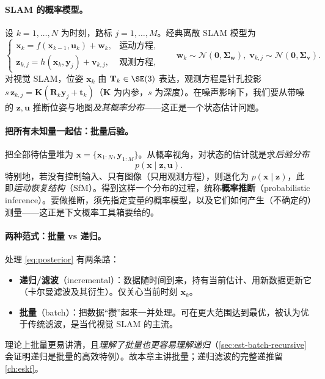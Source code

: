 \paragraph{SLAM 的概率模型。}
设 $k=1,\dots,N$ 为时刻，路标 $j=1,\dots,M$。经典离散 SLAM 模型为\cite{gaoxiang2019slam14}
\begin{equation}
  \begin{cases}
    \mathbf{x}_k=f(\mathbf{x}_{k-1},\mathbf{u}_k)+\mathbf{w}_k, & \text{运动方程},\\
    \mathbf{z}_{k,j}=h(\mathbf{x}_k,\mathbf{y}_j)+\mathbf{v}_{k,j}, & \text{观测方程},
  \end{cases}
  \qquad
  \mathbf{w}_k\sim\mathcal{N}(\mathbf{0},\boldsymbol{\Sigma}_{\mathbf{w}}),\;
  \mathbf{v}_{k,j}\sim\mathcal{N}(\mathbf{0},\boldsymbol{\Sigma}_{\mathbf{v}}).
  \label{eq:slam-model}
\end{equation}
对视觉 SLAM，位姿 $\mathbf{x}_k$ 由 $\mathbf{T}_k\in\SE(3)$ 表达，观测方程是针孔投影 $s\,\mathbf{z}_{k,j}=\mathbf{K}(\mathbf{R}_k\mathbf{y}_j+\mathbf{t}_k)$（$\mathbf{K}$ 为内参，$s$ 为深度）。在噪声影响下，我们要从带噪的 $\mathbf{z},\mathbf{u}$ 推断位姿与地图\emph{及其概率分布}——这正是一个状态估计问题。

\paragraph{把所有未知量一起估：批量后验。}
把全部待估量堆为 $\mathbf{x}=\{\mathbf{x}_{1:N},\mathbf{y}_{1:M}\}$。从概率视角，对状态的估计就是求\emph{后验分布}\cite{gaoxiang2019slam14,carlone2026handbook}
\begin{equation}
  p(\mathbf{x}\mid\mathbf{z},\mathbf{u}).
  \label{eq:posterior}
\end{equation}
特别地，若没有控制输入、只有图像（只用观测方程），则退化为 $p(\mathbf{x}\mid\mathbf{z})$，此即\emph{运动恢复结构}（SfM）。得到这样一个分布的过程，统称\textbf{概率推断}（probabilistic inference）\cite{carlone2026handbook}。要做推断，须先指定变量的概率模型，以及它们如何产生（不确定的）测量——这正是下文概率工具箱要给的。

\paragraph{两种范式：批量 vs 递归。}
处理 \cref{eq:posterior} 有两条路\cite{gaoxiang2019slam14}：
\begin{itemize}
  \item \textbf{递归/滤波}（incremental）：数据随时间到来，持有当前估计、用新数据更新它（卡尔曼滤波及其衍生）。仅关心当前时刻 $\mathbf{x}_k$。
  \item \textbf{批量}（batch）：把数据“攒”起来一并处理。可在更大范围达到最优，被认为优于传统滤波\cite{dellaert2017factor}，是当代视觉 SLAM 的主流。
\end{itemize}
理论上批量更易讲清，且\emph{理解了批量也更容易理解递归}（\cref{sec:est-batch-recursive} 会证明递归是批量的高效特例）。故本章主讲批量；递归滤波的完整递推留 \cref{ch:eskf}。

